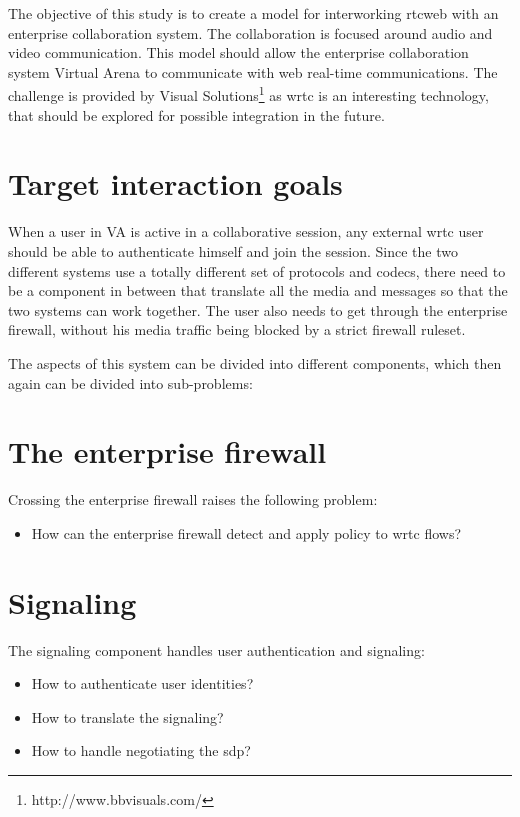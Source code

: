 
The objective of this study is to create a model for interworking \gls{rtcweb} with an enterprise collaboration system. The collaboration is focused around audio and video communication. This model should allow the enterprise collaboration system Virtual Arena to communicate with web real-time communications. The challenge is provided by Visual Solutions\footnote{http://www.bbvisuals.com/} as \gls{wrtc} is an interesting technology, that should be explored for possible integration in the future.

\section{Target interaction goals}
When a user in VA is active in a collaborative session, any external \gls{wrtc} user should be able to authenticate himself and join the session. Since the two different systems use a totally different set of protocols and codecs, there need to be a component in between that translate all the media and messages so that the two systems can work together. The user also needs to get through the enterprise firewall, without his media traffic being blocked by a strict firewall ruleset.

The aspects of this system can be divided into different components, which then again can be divided into sub-problems:

\section{The enterprise firewall}
Crossing the enterprise firewall raises the following problem:
\begin{itemize}
\item{How can the enterprise firewall detect and apply policy to \gls{wrtc} flows?}
\end{itemize}

\section{Signaling}
The signaling component handles user authentication and signaling:
\begin{itemize}
\item{How to authenticate user identities?}
\item{How to translate the signaling?}
\item{How to handle negotiating the \gls{sdp}?}
\end{itemize}

